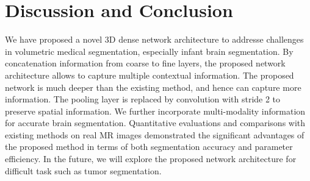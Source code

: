 \documentclass{llncs}
\begin{document}
\section{Discussion and Conclusion}
We have proposed a novel 3D dense network architecture to addresse challenges in volumetric medical segmentation, especially infant brain segmentation. By concatenation information from coarse to fine layers, the proposed network architecture allows to capture multiple contextual information. The proposed network is much deeper than the existing method, and hence can capture more information. The pooling layer is replaced by convolution with stride 2 to preserve spatial information. We further incorporate multi-modality information for accurate brain segmentation. Quantitative evaluations and comparisons with existing methods on real MR images demonstrated the significant advantages of the proposed method in terms of both segmentation accuracy and parameter efficiency. In the future, we will explore the proposed network architecture for difficult task such as tumor segmentation.






\end{document}
